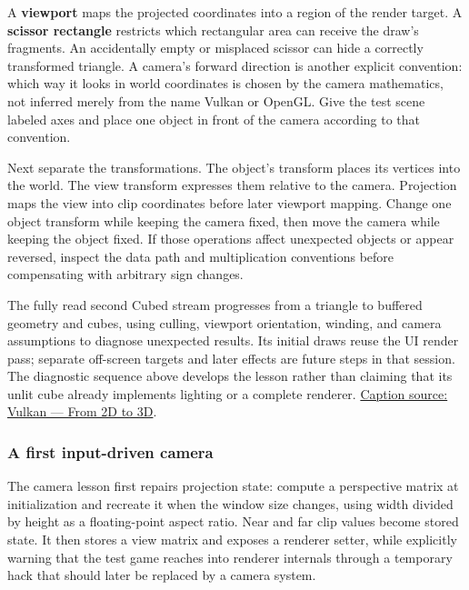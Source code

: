 A \textbf{viewport} maps the projected coordinates into a region of the render target. A \textbf{scissor rectangle} restricts which rectangular area can receive the draw's fragments. An accidentally empty or misplaced scissor can hide a correctly transformed triangle. A camera's forward direction is another explicit convention: which way it looks in world coordinates is chosen by the camera mathematics, not inferred merely from the name Vulkan or OpenGL. Give the test scene labeled axes and place one object in front of the camera according to that convention.

Next separate the transformations. The object's transform places its vertices into the world. The view transform expresses them relative to the camera. Projection maps the view into clip coordinates before later viewport mapping. Change one object transform while keeping the camera fixed, then move the camera while keeping the object fixed. If those operations affect unexpected objects or appear reversed, inspect the data path and multiplication conventions before compensating with arbitrary sign changes.

The fully read second Cubed stream progresses from a triangle to buffered geometry and cubes, using culling, viewport orientation, winding, and camera assumptions to diagnose unexpected results. Its initial draws reuse the UI render pass; separate off-screen targets and later effects are future steps in that session. The diagnostic sequence above develops the lesson rather than claiming that its unlit cube already implements lighting or a complete renderer. \href{https://www.youtube.com/watch?v=hSL9dCjwoCU}{Caption source: Vulkan --- From 2D to 3D}.

\subsubsection{A first input-driven camera}\label{06-engine-ii-ch026-a-first-input-driven-camera}

\hypertarget{06-engine-ii-ch026-a-first-input-driven-camera}{}

The camera lesson first repairs projection state: compute a perspective matrix at initialization and recreate it when the window size changes, using width divided by height as a floating-point aspect ratio. Near and far clip values become stored state. It then stores a view matrix and exposes a renderer setter, while explicitly warning that the test game reaches into renderer internals through a temporary hack that should later be replaced by a camera system.

